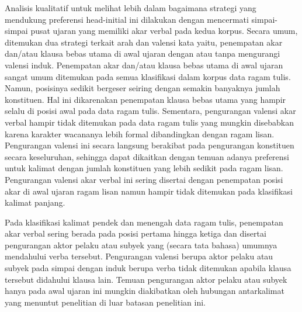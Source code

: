 Analisis kualitatif untuk melihat lebih dalam bagaimana strategi yang mendukung preferensi head-initial ini dilakukan dengan mencermati simpai-simpai pusat ujaran yang memiliki akar verbal pada kedua korpus. Secara umum, ditemukan dua strategi terkait arah dan valensi kata yaitu, penempatan akar dan/atau klausa bebas utama di awal ujaran dengan atau tanpa mengurangi valensi induk. Penempatan akar dan/atau klausa bebas utama di awal ujaran sangat umum ditemukan pada semua klasifikasi dalam korpus data ragam tulis. Namun, posisinya sedikit bergeser seiring dengan semakin banyaknya jumlah konstituen. Hal ini dikarenakan penempatan klausa bebas utama yang hampir selalu di posisi awal pada data ragam tulis. Sementara, pengurangan valensi akar verbal hampir tidak ditemukan pada data ragam tulis yang mungkin disebabkan karena karakter wacananya lebih formal dibandingkan dengan ragam lisan. Pengurangan valensi ini secara langsung berakibat pada pengurangan konstituen secara keseluruhan, sehingga dapat dikaitkan dengan temuan adanya preferensi untuk kalimat dengan jumlah konstituen yang lebih sedikit pada ragam lisan. Pengurangan valensi akar verbal ini sering disertai dengan penempatan posisi akar di awal ujaran ragam lisan namun hampir tidak ditemukan pada klasifikasi kalimat panjang. 

Pada klasifikasi kalimat pendek dan menengah data ragam tulis, penempatan akar verbal sering berada pada posisi pertama hingga ketiga dan disertai pengurangan aktor pelaku atau subyek yang (secara tata bahasa) umumnya mendahului verba tersebut. Pengurangan valensi berupa aktor pelaku atau subyek pada simpai dengan induk berupa verba tidak ditemukan apabila klausa tersebut didahului klausa lain. Temuan pengurangan aktor pelaku atau subyek hanya pada awal ujaran ini mungkin diakibatkan oleh hubungan antarkalimat yang menuntut penelitian di luar batasan penelitian ini. 

